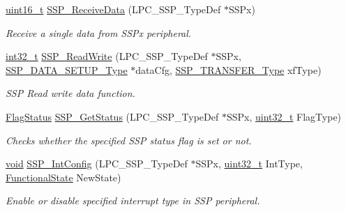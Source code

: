 \begin{DoxyCompactItemize}
\hyperlink{_p_e___types_8h_a1f1825b69244eb3ad2c7165ddc99c956}{uint16\+\_\+t} \hyperlink{group___s_s_p___public___functions_ga14e9bdfc76b1398e4fdb09775fd6c240}{S\+S\+P\+\_\+\+Receive\+Data} (L\+P\+C\+\_\+\+S\+S\+P\+\_\+\+Type\+Def $\ast$S\+S\+Px)
\begin{DoxyCompactList}\small\item\em Receive a single data from S\+S\+Px peripheral. \end{DoxyCompactList}\item 
\hyperlink{_p_e___types_8h_adb828ef50c2dbb783109824e94cf6c47}{int32\+\_\+t} \hyperlink{group___s_s_p___public___functions_gad7af61596a83ee98af9935421480612e}{S\+S\+P\+\_\+\+Read\+Write} (L\+P\+C\+\_\+\+S\+S\+P\+\_\+\+Type\+Def $\ast$S\+S\+Px, \hyperlink{struct_s_s_p___d_a_t_a___s_e_t_u_p___type}{S\+S\+P\+\_\+\+D\+A\+T\+A\+\_\+\+S\+E\+T\+U\+P\+\_\+\+Type} $\ast$data\+Cfg, \hyperlink{group___s_s_p___public___types_ga34f9cea91f43d14807778072c5f3c20f}{S\+S\+P\+\_\+\+T\+R\+A\+N\+S\+F\+E\+R\+\_\+\+Type} xf\+Type)
\begin{DoxyCompactList}\small\item\em S\+SP Read write data function. \end{DoxyCompactList}\item 
\hyperlink{agilefox_2library_2inc_2stm32f10x__type_8h_a89136caac2e14c55151f527ac02daaff}{Flag\+Status} \hyperlink{group___s_s_p___public___functions_gac2aa0464f444c6e57bf09104aa05a135}{S\+S\+P\+\_\+\+Get\+Status} (L\+P\+C\+\_\+\+S\+S\+P\+\_\+\+Type\+Def $\ast$S\+S\+Px, \hyperlink{_p_e___types_8h_a33594304e786b158f3fb30289278f5af}{uint32\+\_\+t} Flag\+Type)
\begin{DoxyCompactList}\small\item\em Checks whether the specified S\+SP status flag is set or not. \end{DoxyCompactList}\item 
\hyperlink{usb__devapi_8h_afabf60e7f57651d6d595a02c75f07cd0}{void} \hyperlink{group___s_s_p___public___functions_ga565b514ade8cdf734f008041df72a946}{S\+S\+P\+\_\+\+Int\+Config} (L\+P\+C\+\_\+\+S\+S\+P\+\_\+\+Type\+Def $\ast$S\+S\+Px, \hyperlink{_p_e___types_8h_a33594304e786b158f3fb30289278f5af}{uint32\+\_\+t} Int\+Type, \hyperlink{agilefox_2library_2inc_2stm32f10x__type_8h_ac9a7e9a35d2513ec15c3b537aaa4fba1}{Functional\+State} New\+State)
\begin{DoxyCompactList}\small\item\em Enable or disable specified interrupt type in S\+SP peripheral. \end{DoxyCompactList}\item 

\end{DoxyCompactItemize}
